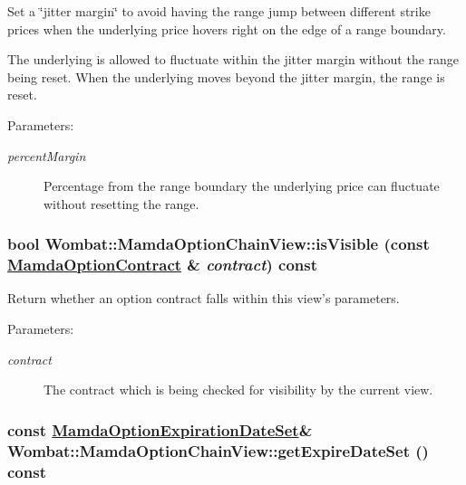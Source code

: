 Set a \char`\"{}jitter margin\char`\"{} to avoid having the range jump between different strike prices when the underlying price hovers right on the edge of a range boundary. 

The underlying is allowed to fluctuate within the jitter margin without the range being reset. When the underlying moves beyond the jitter margin, the range is reset.

\begin{Desc}
\item[Parameters:]
\begin{description}
\item[{\em percent\-Margin}]Percentage from the range boundary the underlying price can fluctuate without resetting the range. \end{description}
\end{Desc}
\hypertarget{classWombat_1_1MamdaOptionChainView_75400cd672fc2befd3d1525d2bf1d4ce}{
\subsubsection[isVisible]{\setlength{\rightskip}{0pt plus 5cm}bool Wombat::Mamda\-Option\-Chain\-View::is\-Visible (const \hyperlink{classWombat_1_1MamdaOptionContract}{Mamda\-Option\-Contract} \& {\em contract}) const}}
\label{classWombat_1_1MamdaOptionChainView_75400cd672fc2befd3d1525d2bf1d4ce}


Return whether an option contract falls within this view's parameters. 

\begin{Desc}
\item[Parameters:]
\begin{description}
\item[{\em contract}]The contract which is being checked for visibility by the current view. \end{description}
\end{Desc}
\hypertarget{classWombat_1_1MamdaOptionChainView_a177b7d79939b2e73baca1c04c8fba61}{
\subsubsection[getExpireDateSet]{\setlength{\rightskip}{0pt plus 5cm}const \hyperlink{classWombat_1_1MamdaOptionExpirationDateSet}{Mamda\-Option\-Expiration\-Date\-Set}\& Wombat::Mamda\-Option\-Chain\-View::get\-Expire\-Date\-Set () const}}
\label{classWombat_1_1MamdaOptionChainView_a177b7d79939b2e73baca1c04c8fba61}


